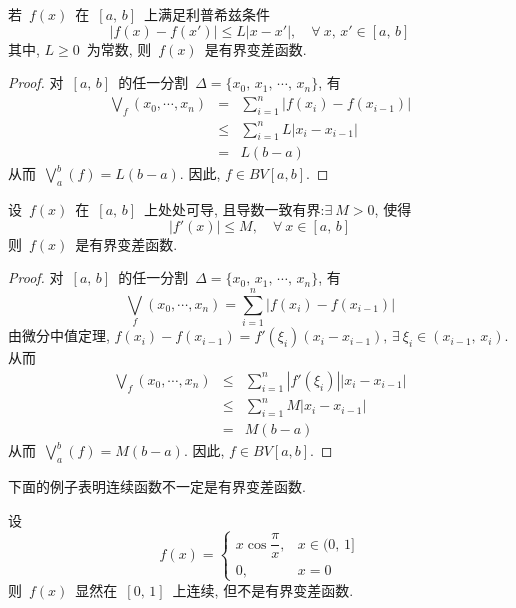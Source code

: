 \begin{example}
若~$f(x)$~在~$[a,\,b]$~上满足利普希兹条件
\[
|f(x) - f(x')| \leqslant L |x - x'|, \quad \forall~x,\,x' \in [a,\,b]
\]
其中, $L \geqslant 0$~为常数, 则~$f(x)$~是有界变差函数.
\end{example}

\begin{proof}
对~$[a,\,b]$~的任一分割~$\Delta = \{x_0,\,x_1,\,\cdots,\,x_n\}$, 有
\begin{eqnarray*}
\textstyle{\bigvee}_f(x_0,\cdots,x_n) &=& \sum_{i=1}^n \big| f(x_i)-f(x_{i-1}) \big| \\
&\leqslant& \sum_{i=1}^n L |x_i - x_{i-1}| \\
&=& L(b-a)
\end{eqnarray*}
从而~$\bigvee\limits_a^b(f) = L(b-a)$. 因此, $f \in BV[a,b]$.
\end{proof}

\begin{example}
设~$f(x)$~在~$[a,\,b]$~上处处可导, 且导数一致有界:$\exists~M > 0$, 使得
\[
|f'(x)| \leqslant M, \quad \forall~x \in [a,\,b]
\]
则~$f(x)$~是有界变差函数.
\end{example}

\begin{proof}
对~$[a,\,b]$~的任一分割~$\Delta = \{x_0,\,x_1,\,\cdots,\,x_n\}$, 有
\[
{\textstyle{\bigvee}}_f(x_0,\cdots,x_n) = \sum_{i=1}^n \big| f(x_i)-f(x_{i-1}) \big|
\]
由微分中值定理, $f(x_i)-f(x_{i-1}) = f'(\xi_i)(x_i - x_{i-1}), \, \exists~\xi_i \in (x_{i-1},\,x_i)$. 从而
\begin{eqnarray*}
\textstyle{\bigvee}_f(x_0,\cdots,x_n) &\leqslant& \sum_{i=1}^n |f'(\xi_i)||x_i - x_{i-1}| \\
&\leqslant& \sum_{i=1}^n M |x_i - x_{i-1}| \\
&=& M(b-a)
\end{eqnarray*}
从而~$\bigvee\limits_a^b(f) = M(b-a)$. 因此, $f \in BV[a,b]$.
\end{proof}

下面的例子表明连续函数不一定是有界变差函数.

\begin{example}
设
\[
f(x) = \left\{\!\!
\begin{array}{cl}
x \cos \dfrac{\pi}{x}, & x \in (0,\,1] \\[0.3cm]
0, & x = 0
\end{array}
\right.
\]
则~$f(x)$~显然在~$[0,\,1]$~上连续, 但不是有界变差函数.
\end{example}

